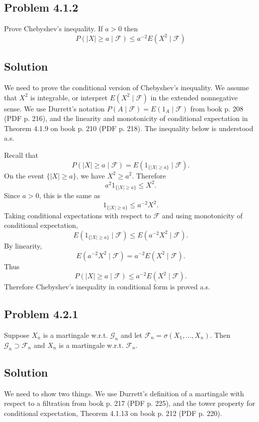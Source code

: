 \documentclass[a4paper,12pt,openany]{article}
\theoremstyle{plain}
\theoremstyle{definition}
\begin{document}
\subsection*{Problem 4.1.2}

Prove Chebyshev’s inequality. If $a > 0$ then
\[
P(|X| \ge a \mid \mathcal{F}) \le a^{-2}E(X^2 \mid \mathcal{F})
\]

\subsection*{Solution}

We need to prove the conditional version of Chebyshev's inequality. We assume that $X^2$ is integrable, or interpret $E(X^2\mid\mathcal{F})$ in the extended nonnegative sense. We use Durrett's notation $P(A\mid\mathcal{F})=E(1_A\mid\mathcal{F})$ from book p. 208 (PDF p. 216), and the linearity and monotonicity of conditional expectation in Theorem 4.1.9 on book p. 210 (PDF p. 218). The inequality below is understood a.s.

\medskip

Recall that
\[
P(|X|\ge a\mid\mathcal{F})
=
E(1_{\{|X|\ge a\}}\mid\mathcal{F}).
\]
On the event $\{|X|\ge a\}$, we have $X^2\ge a^2$. Therefore
\[
a^2 1_{\{|X|\ge a\}}
\le
X^2.
\]
Since $a>0$, this is the same as
\[
1_{\{|X|\ge a\}}
\le
a^{-2}X^2.
\]
Taking conditional expectations with respect to $\mathcal{F}$ and using monotonicity of conditional expectation,
\[
E(1_{\{|X|\ge a\}}\mid\mathcal{F})
\le
E(a^{-2}X^2\mid\mathcal{F}).
\]
By linearity,
\[
E(a^{-2}X^2\mid\mathcal{F})
=
a^{-2}E(X^2\mid\mathcal{F}).
\]
Thus
\[
P(|X| \ge a \mid \mathcal{F})
\le
a^{-2}E(X^2 \mid \mathcal{F}).
\]
Therefore Chebyshev's inequality in conditional form is proved a.s.

\subsection*{Problem 4.2.1}

Suppose $X_n$ is a martingale w.r.t. $\mathcal{G}_n$ and let $\mathcal{F}_n = \sigma(X_1,\ldots,X_n)$. Then $\mathcal{G}_n \supset \mathcal{F}_n$ and $X_n$ is a martingale w.r.t. $\mathcal{F}_n$.

\subsection*{Solution}

We need to show two things. We use Durrett's definition of a martingale with respect to a filtration from book p. 217 (PDF p. 225), and the tower property for conditional expectation, Theorem 4.1.13 on book p. 212 (PDF p. 220).
\end{document}
